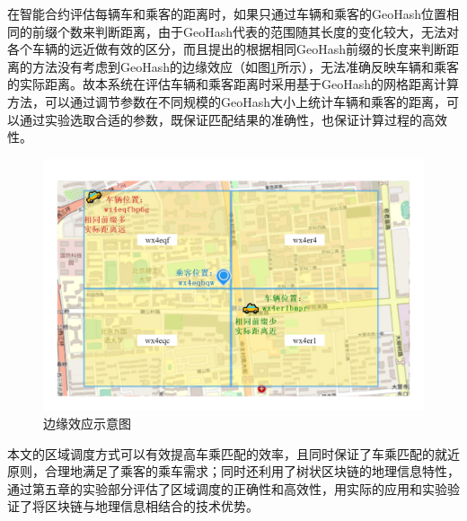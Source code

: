 在智能合约评估每辆车和乘客的距离时，如果只通过车辆和乘客的GeoHash位置相同的前缀个数来判断距离，由于GeoHash代表的范围随其长度的变化较大，无法对各个车辆的远近做有效的区分，而且提出的根据相同GeoHash前缀的长度来判断距离的方法没有考虑到GeoHash的边缘效应（如图\ref{fig:special}所示），无法准确反映车辆和乘客的实际距离。故本系统在评估车辆和乘客距离时采用基于GeoHash的网格距离计算方法，可以通过调节参数在不同规模的GeoHash大小上统计车辆和乘客的距离，可以通过实验选取合适的参数，既保证匹配结果的准确性，也保证计算过程的高效性。

\begin{figure}
  \centering
  \includegraphics[width=1.0\textwidth]{figures/边缘效应}
  \caption{边缘效应示意图}\label{fig:special}
\end{figure}

本文的区域调度方式可以有效提高车乘匹配的效率，且同时保证了车乘匹配的就近原则，合理地满足了乘客的乘车需求；同时还利用了树状区块链的地理信息特性，通过第五章的实验部分评估了区域调度的正确性和高效性，用实际的应用和实验验证了将区块链与地理信息相结合的技术优势。

